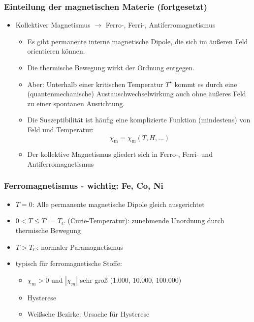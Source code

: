 \begin{frame}
  \frametitle{Einteilung der magnetischen Materie (fortgesetzt)}
  \begin{itemize}[<+->]
    \item \alert{Kollektiver Magnetismus} $\to$ Ferro-, Ferri-, Antiferromagnetismus
    \begin{itemize}[<+->]
    \item Es gibt \alert{permanente interne magnetische Dipole}, die sich im äußeren Feld orientieren können.
    \item Die thermische Bewegung wirkt der Ordnung entgegen.
      \item Aber: Unterhalb einer kritischen Temperatur $T^\star$ kommt es durch eine (quantenmechanische) \alert{Austauschwechselwirkung} auch ohne äußeres Feld zu einer \alert{spontanen Ausrichtung}.
    \item Die Suszeptibilität ist häufig eine komplizierte Funktion (mindestens) von Feld und Temperatur:
      $$
      \chi_\mathrm{m} = \chi_\mathrm{m}(T, H, \dots)
      $$
      \item Der kollektive Magnetismus gliedert sich in Ferro-, Ferri- und Antiferromagnetismus
      \end{itemize}
\end{itemize}
\end{frame}


\begin{frame}
  \frametitle{Ferromagnetismus - wichtig: Fe, Co, Ni}
  \begin{itemize}[<+->]
  \item $T=0$: Alle permanente magnetische Dipole gleich ausgerichtet
  \item $0<T\le T^\star=T_C$ \alert{(Curie-Temperatur)}: zunehmende Unordnung durch thermische Bewegung
  \item $T>T_C$: normaler Paramagnetismus
    \item typisch für ferromagnetische Stoffe:
  \begin{itemize}[<+->]
  \item $\chi_m > 0$ und $|\chi_m|$ sehr groß (1.000, 10.000, 100.000)
    \item Hysterese
    \item Weißsche Bezirke: Ursache für Hysterese
  \end{itemize}
\end{itemize}\pause
\resizebox{.4\linewidth}{!}{}\hspace*{1cm}\resizebox{.4\linewidth}{!}{}
\end{frame}

